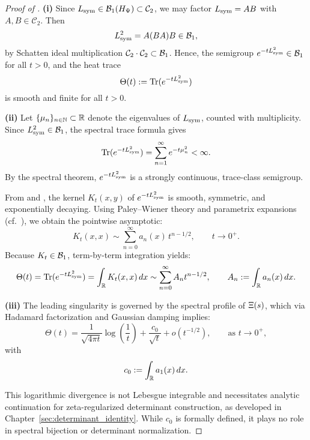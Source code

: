 \begin{proof}[Proof of ]
\textbf{(i)} Since \( L_{\mathrm{sym}} \in \mathcal{B}_1(H_{\Psi}) \subset \mathcal{C}_2 \), we may factor \( L_{\mathrm{sym}} = AB \) with \( A, B \in \mathcal{C}_2 \). Then
\[
L_{\mathrm{sym}}^2 = A(BA)B \in \mathcal{B}_1,
\]
by Schatten ideal multiplication \( \mathcal{C}_2 \cdot \mathcal{C}_2 \subset \mathcal{B}_1 \). Hence, the semigroup \( e^{-tL_{\mathrm{sym}}^2} \in \mathcal{B}_1 \) for all \( t > 0 \), and the heat trace
\[
\Theta(t) := \operatorname{Tr}(e^{-tL_{\mathrm{sym}}^2})
\]
is smooth and finite for all \( t > 0 \).

\textbf{(ii)} Let \( \{ \mu_n \}_{n \in \mathbb{N}} \subset \mathbb{R} \) denote the eigenvalues of \( L_{\mathrm{sym}} \), counted with multiplicity. Since \( L_{\mathrm{sym}}^2 \in \mathcal{B}_1 \), the spectral trace formula gives
\[
\operatorname{Tr}(e^{-tL_{\mathrm{sym}}^2}) = \sum_{n=1}^{\infty} e^{-t \mu_n^2} < \infty.
\]
By the spectral theorem, \( e^{-tL_{\mathrm{sym}}^2} \) is a strongly continuous, trace-class semigroup.

From  and , the kernel \( K_t(x,y) \) of \( e^{-tL_{\mathrm{sym}}^2} \) is smooth, symmetric, and exponentially decaying. Using Paley–Wiener theory and parametrix expansions (cf.~\cite[Ch.~III]{Korevaar2004Tauberian}), we obtain the pointwise asymptotic:
\[
K_t(x,x) \sim \sum_{n=0}^{\infty} a_n(x)\, t^{n - 1/2}, \qquad t \to 0^+.
\]
Because \( K_t \in \mathcal{B}_1 \), term-by-term integration yields:
\[
\Theta(t) = \operatorname{Tr}(e^{-tL_{\mathrm{sym}}^2}) = \int_{\mathbb{R}} K_t(x,x) \, dx \sim \sum_{n=0}^{\infty} A_n t^{n - 1/2}, \qquad A_n := \int_{\mathbb{R}} a_n(x) \, dx.
\]

\textbf{(iii)} The leading singularity is governed by the spectral profile of \( \Xi(s) \), which via Hadamard factorization and Gaussian damping implies:
\[
\Theta(t) = \frac{1}{\sqrt{4\pi t}} \log\left( \frac{1}{t} \right) + \frac{c_0}{\sqrt{t}} + o(t^{-1/2}), \qquad \text{as } t \to 0^+,
\]
with
\[
c_0 := \int_{\mathbb{R}} a_1(x)\, dx.
\]

This logarithmic divergence is not Lebesgue integrable and necessitates analytic continuation for zeta-regularized determinant construction, as developed in Chapter~\ref{sec:determinant_identity}. While \( c_0 \) is formally defined, it plays no role in spectral bijection or determinant normalization.

\end{proof}

